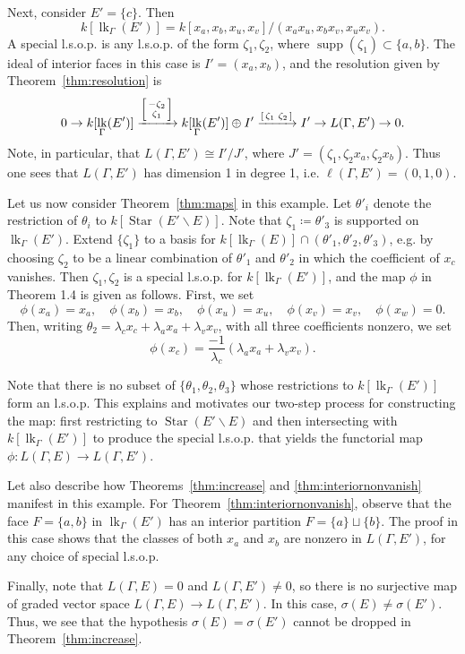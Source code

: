 \documentclass[ALCO, Unicode,published]{cedram}
\DeclareMathOperator{\lk}{lk}
\DeclareMathOperator{\Star}{Star}
\DeclareMathOperator{\supp}{supp}
\begin{document}
\begin{example}
Next, consider $E' = \{c\}$.  Then 
\[
k[\lk_\Gamma(E')] = k[x_a, x_b, x_u, x_v] / (x_ax_u, x_bx_v, x_ux_v).
\]
A special l.s.o.p. is any l.s.o.p. of the form $\zeta_1, \zeta_2$, where $\supp(\zeta_1) \subset \{a, b\}$. The ideal of interior faces in this case is $I' = (x_a, x_b)$, and the resolution given by Theorem~\ref{thm:resolution} is
\[
0 \to k[\lk_\Gamma(E')] \xrightarrow{\begin{bsmallmatrix}
-\zeta_2 \\
\zeta_1 \\
\end{bsmallmatrix}} k[\lk_\Gamma(E')] \oplus I' \xrightarrow{\begin{bsmallmatrix}
\zeta_1 &
\zeta_2
\end{bsmallmatrix}} I' \to L(\Gamma,E') \to 0.
\] 
Note, in particular, that $L(\Gamma,E') \cong I'/J'$, where $J' = (\zeta_1, \zeta_2 x_a, \zeta_2 x_b)$. Thus one sees that $L(\Gamma,E')$ has dimension 1 in degree 1, i.e. $\ell(\Gamma, E') = (0,1,0)$.

Let us now consider Theorem~\ref{thm:maps} in this example.  Let $\theta'_i$ denote the restriction of $\theta_i$ to $k[\Star(E' \smallsetminus E)]$.  Note that $\zeta_1  \coloneqq  \theta'_3$ is supported on $\lk_\Gamma(E')$. Extend $\{ \zeta_1 \}$ to a basis for $k[\lk_\Gamma(E)] \cap (\theta'_1, \theta'_2, \theta'_3)$, e.g. by choosing $\zeta_2$ to be a linear combination of $\theta'_1$ and $\theta'_2$ in which the coefficient of $x_c$ vanishes.  Then $\zeta_1, \zeta_2$ is a special l.s.o.p. for $k[\lk_\Gamma(E')]$, and the map $\phi$ in Theorem 1.4 is given as follows.  First, we set
\[
\phi(x_a) = x_a, \quad \phi(x_b) = x_b, \quad \phi(x_u) = x_u, \quad \phi(x_v) = x_v, \quad \phi(x_w) = 0.
\]
Then, writing $\theta_2 = \lambda_c x_c + \lambda_a x_a + \lambda_v x_v$, with all three coefficients nonzero, we set 
\[
\phi(x_c) = \frac{-1}{\lambda_c} (\lambda_ax_a + \lambda_v x_v).
\]


Note that there is no subset of $\{ \theta_1, \theta_2, \theta_3 \}$ whose restrictions to $k[\lk_\Gamma(E')]$ form an l.s.o.p.  This explains and motivates our two-step process for constructing the map: first restricting to $\Star(E' \smallsetminus E)$ and then intersecting with $k[\lk_\Gamma(E')]$ to produce the special l.s.o.p. that yields the functorial map $\phi \colon L(\Gamma,E) \to L(\Gamma,E')$.


Let also describe how Theorems~\ref{thm:increase} and \ref{thm:interiornonvanish}  manifest in this example.  For Theorem~\ref{thm:interiornonvanish}, observe that the face $F = \{a, b\}$ in $\lk_\Gamma(E')$ has an interior partition $F = \{a\} \sqcup \{b\}$. The proof in this case shows that the classes of both $x_a$ and $x_b$ are nonzero in $L(\Gamma,E')$, for any choice of special l.s.o.p.

Finally, note that $L(\Gamma,E) = 0$ and $L(\Gamma, E') \neq 0$, so there is no surjective map of graded vector space $L(\Gamma,E) \to L(\Gamma,E')$.  In this case, $\sigma(E) \neq \sigma(E')$.  Thus, we see that the hypothesis $\sigma(E) = \sigma(E')$ cannot be dropped in Theorem~\ref{thm:increase}.
\end{example}
\end{document}

